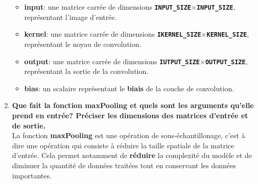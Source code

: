 \begin{enumerate}
{\begin{itemize}
      \item \textbf{input}: une matrice carrée de dimensions \textbf{\lstinline{INPUT_SIZE}}$\times$\textbf{\lstinline{INPUT_SIZE}}, représentant l'image d'entrée.
      \item \textbf{kernel}: une matrice carrée de dimensions \textbf{\lstinline{IKERNEL_SIZE}}$\times$\textbf{\lstinline{KERNEL_SIZE}}, représentant le noyau de convolution.
      \item \textbf{output}: une matrice carrée de dimensions \textbf{\lstinline{IUTPUT_SIZE}}$\times$\textbf{\lstinline{OUTPUT_SIZE}}, représentant la sortie de la convolution.
      \item \textbf{bias}: un scalaire représentant le \textbf{biais} de la couche de convolution. \\
    \end{itemize}
  }
  \item {
    \textbf{Que fait la fonction maxPooling et quels sont les arguments qu'elle prend en entrée? Préciser les dimensions des matrices d'entrée et de sortie.} \vspace{0.2cm}\\
    La fonction \textbf{maxPooling} est une opération de sous-échantillonage, c'est à dire une opération qui consiste à réduire la taille spatiale de la matrice d'entrée.
    Cela permet notamment de \textbf{réduire} la complexité du modèle et de diminuer la quantité de données traitées tout en conservant les données importantes.

}
\end{enumerate}

